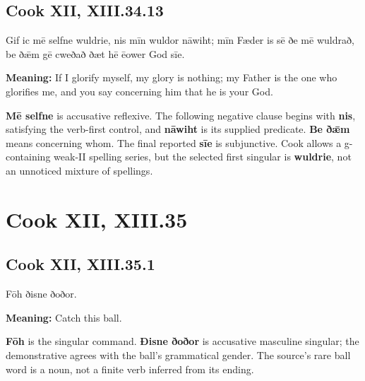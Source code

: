 \par\begin{minipage}{\linewidth}\raggedright
\subsection*{Cook XII, XIII.34.13}

Gif ic mē selfne wuldrie, nis mīn wuldor nāwiht; mīn Fæder is sē ðe mē wuldrað, be ðǣm gē cweðað ðæt hē ēower God sīe.

\textbf{Meaning:} If I glorify myself, my glory is nothing; my Father is the one who glorifies me, and you say concerning him that he is your God.

\textbf{Mē selfne} is accusative reflexive. The following negative clause begins with \textbf{nis}, satisfying the verb-first control, and \textbf{nāwiht} is its supplied predicate. \textbf{Be ðǣm} means concerning whom. The final reported \textbf{sīe} is subjunctive. Cook allows a g-containing weak-II spelling series, but the selected first singular is \textbf{wuldrie}, not an unnoticed mixture of spellings.

\end{minipage}\par\addvspace{4pt}

\clearpage
\section*{Cook XII, XIII.35}

\par\begin{minipage}{\linewidth}\raggedright
\subsection*{Cook XII, XIII.35.1}

Fōh ðisne ðoðor.

\textbf{Meaning:} Catch this ball.

\textbf{Fōh} is the singular command. \textbf{Ðisne ðoðor} is accusative masculine singular; the demonstrative agrees with the ball’s grammatical gender. The source’s rare ball word is a noun, not a finite verb inferred from its ending.

\end{minipage}\par\addvspace{4pt}

